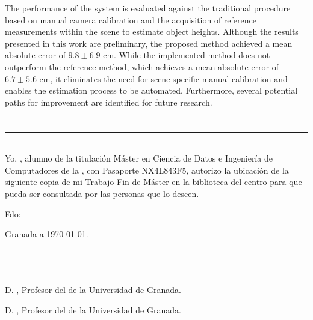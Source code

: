 The performance of the system is evaluated against the traditional procedure based on manual camera calibration and the
acquisition of reference measurements within the scene to estimate object heights.
Although the results presented in this work are preliminary, the proposed method achieved a
mean absolute error of $9.8\pm6.9$ cm.
While the implemented method does not outperform the reference method,
which achieves a mean absolute error of $6.7\pm5.6$ cm, it eliminates the need for scene-specific manual calibration and enables the estimation process to be automated.
Furthermore, several potential paths for improvement are identified for future research.

\chapter*{}
\thispagestyle{empty}

\noindent\rule[-1ex]{\textwidth}{2pt}\\[4.5ex]

Yo, \textbf{\myName}, alumno de la titulación Máster en Ciencia de Datos e Ingeniería de Computadores
de la \textbf{\myFaculty},
con Pasaporte NX4L843F5, autorizo la ubicación de la siguiente copia de mi
Trabajo Fin de Máster en la biblioteca del centro para que pueda ser
consultada por las personas que lo deseen.

\vspace{6cm}

\noindent Fdo: \myName

\vspace{2cm}

\begin{flushright}
Granada a \today.
\end{flushright}


\chapter*{}
\thispagestyle{empty}

\noindent\rule[-1ex]{\textwidth}{2pt}\\[4.5ex]

D. \textbf{\myProf}, Profesor del \myDepartment de la Universidad de Granada.

\vspace{0.5cm}

D. \textbf{\myOtherProf}, Profesor del \myDepartment de la Universidad de Granada.


\vspace{0.5cm}


